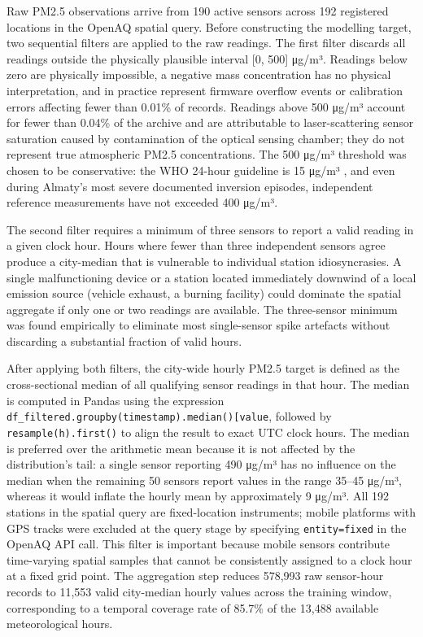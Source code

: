 Raw PM2.5 observations arrive from 190 active sensors across 192 registered locations in the OpenAQ spatial query. Before constructing the modelling target, two sequential filters are applied to the raw readings. The first filter discards all readings outside the physically plausible interval {[}0, 500{]} μg/m³. Readings below zero are physically impossible, a negative mass concentration has no physical interpretation, and in practice represent firmware overflow events or calibration errors affecting fewer than 0.01\% of records. Readings above 500 μg/m³ account for fewer than 0.04\% of the archive and are attributable to laser-scattering sensor saturation caused by contamination of the optical sensing chamber; they do not represent true atmospheric PM2.5 concentrations. The 500 μg/m³ threshold was chosen to be conservative: the WHO 24-hour guideline is 15 μg/m³ \cite{who_aqg_2021}, and even during Almaty's most severe documented inversion episodes, independent reference measurements have not exceeded 400 μg/m³.

The second filter requires a minimum of three sensors to report a valid reading in a given clock hour. Hours where fewer than three independent sensors agree produce a city-median that is vulnerable to individual station idiosyncrasies. A single malfunctioning device or a station located immediately downwind of a local emission source (vehicle exhaust, a burning facility) could dominate the spatial aggregate if only one or two readings are available. The three-sensor minimum was found empirically to eliminate most single-sensor spike artefacts without discarding a substantial fraction of valid hours.

After applying both filters, the city-wide hourly PM2.5 target is defined as the cross-sectional median of all qualifying sensor readings in that hour. The median is computed in Pandas using the expression \texttt{df\_filtered.groupby(\textquotesingle{}timestamp\textquotesingle{}).median(){[}\textquotesingle{}value\textquotesingle{}{]}}, followed by \texttt{resample(\textquotesingle{}h\textquotesingle{}).first()} to align the result to exact UTC clock hours. The median is preferred over the arithmetic mean because it is not affected by the distribution's tail: a single sensor reporting 490 μg/m³ has no influence on the median when the remaining 50 sensors report values in the range 35--45 μg/m³, whereas it would inflate the hourly mean by approximately 9 μg/m³. All 192 stations in the spatial query are fixed-location instruments; mobile platforms with GPS tracks were excluded at the query stage by specifying \texttt{entity=fixed} in the OpenAQ API call. This filter is important because mobile sensors contribute time-varying spatial samples that cannot be consistently assigned to a clock hour at a fixed grid point. The aggregation step reduces 578,993 raw sensor-hour records to 11,553 valid city-median hourly values across the training window, corresponding to a temporal coverage rate of 85.7\% of the 13,488 available meteorological hours.

